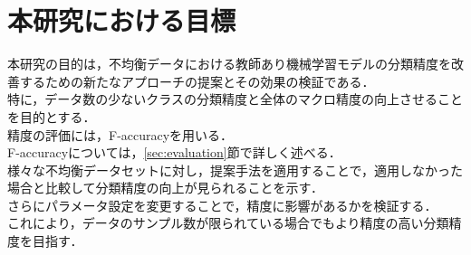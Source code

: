 \section{本研究における目標}

本研究の目的は，不均衡データにおける教師あり機械学習モデルの分類精度を改善するための新たなアプローチの提案とその効果の検証である．\\
特に，データ数の少ないクラスの分類精度と全体のマクロ精度の向上させることを目的とする．\\
精度の評価には，F-accuracyを用いる．\\
F-accuracyについては，\ref{sec:evaluation}節で詳しく述べる．\\
様々な不均衡データセットに対し，提案手法を適用することで，適用しなかった場合と比較して分類精度の向上が見られることを示す．\\
さらにパラメータ設定を変更することで，精度に影響があるかを検証する．\\
これにより，データのサンプル数が限られている場合でもより精度の高い分類精度を目指す．\\
